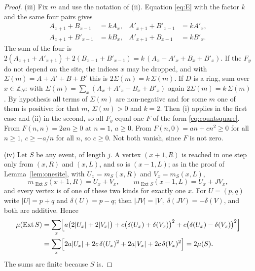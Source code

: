 \begin{proof}
(iii) Fix $m$ and use the notation of (ii). Equation \eqref{eq:E} with the factor $k$ and the same four pairs gives
\begin{align*}
A_{x+1}+B_{x-1}&=kA_x, & A'_{x+1}+B'_{x-1}&=kA'_x,\\
A_{x+1}+B'_{x-1}&=kB_x, & A'_{x+1}+B_{x-1}&=kB'_x .
\end{align*}
The sum of the four is $2(A_{x+1}+A'_{x+1})+2(B_{x-1}+B'_{x-1})=k\,(A_x+A'_x+B_x+B'_x)$. If the $F_y$ do not depend on the site, the indices $x$ may be dropped, and with $\Sigma(m)=A+A'+B+B'$ this is $2\Sigma(m)=k\,\Sigma(m)$. If $D$ is a ring, sum over $x\in\mathbb{Z}_N$: with $\Sigma(m)=\sum_x(A_x+A'_x+B_x+B'_x)$ again $2\Sigma(m)=k\,\Sigma(m)$. By hypothesis all terms of $\Sigma(m)$ are non-negative and for some $m$ one of them is positive; for that $m$, $\Sigma(m)>0$ and $k=2$. Then (i) applies in the first case and (ii) in the second, so all $F_y$ equal one $F$ of the form \eqref{eq:countsquare}. From $F(n,n)=2an\ge0$ at $n=1$, $a\ge0$. From $F(n,0)=an+cn^2\ge0$ for all $n\ge1$, $c\ge-a/n$ for all $n$, so $c\ge0$. Not both vanish, since $F$ is not zero.

(iv) Let $S$ be any event, of length $j$. A vertex $(x+1,R)$ is reached in one step only from $(x,R)$ and $(x,L)$, and so is $(x-1,L)$; as in the proof of Lemma~\ref{lem:onesite}, with $U_x=m_S(x,R)$ and $V_x=m_S(x,L)$,
\[
m_{\operatorname{Ext}S}(x+1,R)=U_x+V_x,\qquad m_{\operatorname{Ext}S}(x-1,L)=U_x+JV_x ,
\]
and every vertex is of one of these two kinds for exactly one $x$. For $U=(p,q)$ write $|U|=p+q$ and $\delta(U)=p-q$; then $|JV|=|V|$, $\delta(JV)=-\delta(V)$, and both are additive. Hence
\begin{align*}
\mu(\operatorname{Ext}S)&=\sum_x\Bigl[a\bigl(2|U_x|+2|V_x|\bigr)+c\bigl(\delta(U_x)+\delta(V_x)\bigr)^2+c\bigl(\delta(U_x)-\delta(V_x)\bigr)^2\Bigr]\\
&=\sum_x\Bigl[2a|U_x|+2c\,\delta(U_x)^2+2a|V_x|+2c\,\delta(V_x)^2\Bigr]=2\mu(S).
\end{align*}
The sums are finite because $S$ is.
\end{proof}

